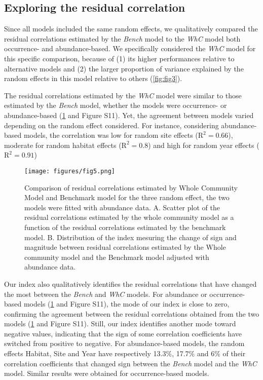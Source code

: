 \documentclass[9pt,biorxiv,doublespacing,lineno,endfloat]{lapreprint}
\begin{document}
\hypertarget{exploring-the-residual-correlation}{%
\subsection{Exploring the residual
correlation}\label{exploring-the-residual-correlation}}

Since all models included the same random effects, we qualitatively
compared the residual correlations estimated by the \emph{Bench} model
to the \emph{WhC} model both occurrence- and abundance-based. We
specifically considered the \emph{WhC} model for this specific
comparison, because of (1) its higher performances relative to
alternative models and (2) the larger proportion of variance explained
by the random effects in this model relative to others
(\cref{fig:fig3}).

The residual correlations estimated by the \emph{WhC} model were similar
to those estimated by the \emph{Bench} model, whether the models were
occurrence- or abundance-based (\cref{fig:fig5} and Figure S11). Yet,
the agreement between models varied depending on the random effect
considered. For instance, considering abundance-based models, the
correlation was low for random site effects (\(\text{R}^2 = 0.66\)),
moderate for random habitat effects (\(\text{R}^2 = 0.8\)) and high for
random year effects (\(\text{R}^2 = 0.91\))

\begin{figure}
\hypertarget{fig:fig5}{%
\centering
\texttt{[image: figures/fig5.png]}
\caption{Comparison of residual correlations estimated by Whole
Community Model and Benchmark model for the three random effect, the two
models were fitted with abundance data. A. Scatter plot of the residual
correlations estimated by the whole community model as a function of the
residual correlations estimated by the benchmark model. B. Distribution
of the index mesuring the change of sign and magnitude between residual
correlations estimated by the Whole community model and the Benchmark
model adjusted with abundance data.}\label{fig:fig5}
}
\end{figure}

Our index also qualitatively identifies the residual correlations that
have changed the most between the \emph{Bench} and \emph{WhC} models.
For abundance or occurrence-based models (\cref{fig:fig5} and Figure
S11), the mode of our index is close to zero, confirming the agreement
between the residual correlations obtained from the two models
(\cref{fig:fig5} and Figure S11). Still, our index identifies another
mode toward negative values, indicating that the sign of some
correlation coefficients have switched from positive to negative. For
abundance-based models, the random effects Habitat, Site and Year have
respectively 13.3\%, 17.7\% and 6\% of their correlation coefficients
that changed sign between the \emph{Bench} model and the \emph{WhC}
model. Similar results were obtained for occurrence-based models.
\end{document}

